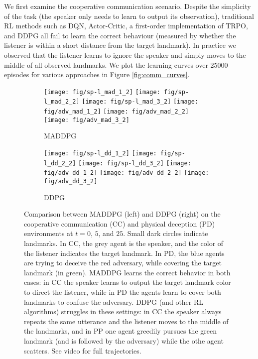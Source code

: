\documentclass{article}
\begin{document}
We first examine the cooperative communication scenario. Despite the simplicity of the task (the speaker only needs to learn to output its observation), traditional RL methods such as DQN, Actor-Critic, a first-order implementation of TRPO, and DDPG all fail to learn the correct behaviour (measured by whether the listener is within a short distance from the target landmark). In practice we observed that the listener learns to ignore the speaker and simply moves to the middle of all observed landmarks. We plot the learning curves over 25000 episodes for various approaches in Figure \ref{fig:comm_curves}.%



\begin{figure}
\begin{subfigure}{.50\textwidth}
  \centering
  \texttt{[image: fig/sp-l\_mad\_1\_2]}
  \texttt{[image: fig/sp-l\_mad\_2\_2]}
  \texttt{[image: fig/sp-l\_mad\_3\_2]}
  \texttt{[image: fig/adv\_mad\_1\_2]}
  \texttt{[image: fig/adv\_mad\_2\_2]}
  \texttt{[image: fig/adv\_mad\_3\_2]}
  \caption{MADDPG}
\end{subfigure}
\hspace{1mm}
\begin{subfigure}{.50\textwidth}
  \centering
  \texttt{[image: fig/sp-l\_dd\_1\_2]}
  \texttt{[image: fig/sp-l\_dd\_2\_2]}
  \texttt{[image: fig/sp-l\_dd\_3\_2]}
  \texttt{[image: fig/adv\_dd\_1\_2]}
  \texttt{[image: fig/adv\_dd\_2\_2]}
  \texttt{[image: fig/adv\_dd\_3\_2]}
  \caption{DDPG}
\end{subfigure}
\vspace{-2mm}
\caption{Comparison between MADDPG (left) and DDPG (right) on the cooperative communication (CC) and physical deception (PD) environments at $t=0$, $5$, and $25$. Small dark circles indicate landmarks. In CC, the grey agent is the speaker, and the color of the listener indicates the target landmark. In PD, the blue agents are trying to deceive the red adversary, while covering the target landmark (in green). MADDPG learns the correct behavior in both cases: in CC the speaker learns to output the target landmark color to direct the listener, while in PD the agents learn to cover both landmarks to confuse the adversary. DDPG (and other RL algorithms) struggles in these settings: in CC the speaker always repeats the same utterance and the listener moves to the middle of the landmarks, and in PP one agent greedily pursues the green landmark (and is followed by the adversary) while the othe agent scatters. See video for full trajectories. \vspace{-4mm}}\label{fig:disp}
\end{figure}
\end{document}
